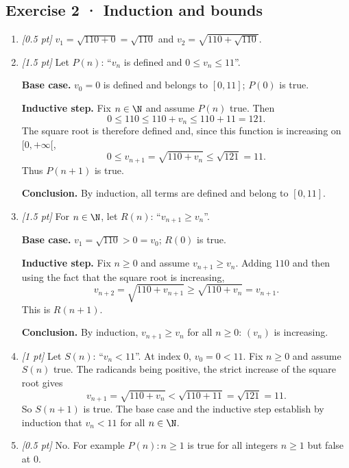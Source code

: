 \subsection*{Exercise 2 · Induction and bounds}\begin{enumerate}

\item \textit{[0.5 pt]} $v_1=\sqrt{110+0}=\sqrt{110}$ and $v_2=\sqrt{110+\sqrt{110}}$.

\item \textit{[1.5 pt]} Let $P(n)$: ``$v_n$ is defined and $0\le v_n\le 11$''.
\par\smallskip\textbf{Base case.} $v_0=0$ is defined and belongs to $[0,11]$; $P(0)$ is true.
\par\smallskip\textbf{Inductive step.} Fix $n\in\N$ and assume $P(n)$ true. Then
\[0\le 110\le 110+v_n\le 110+11=121.\]
The square root is therefore defined and, since this function is increasing on $[0,+\infty[$,
\[0\le v_{n+1}=\sqrt{110+v_n}\le\sqrt{121}=11.\]
Thus $P(n+1)$ is true.
\par\smallskip\textbf{Conclusion.} By induction, all terms are defined and belong to $[0,11]$.

\item \textit{[1.5 pt]} For $n\in\N$, let $R(n)$: ``$v_{n+1}\ge v_n$''.
\par\smallskip\textbf{Base case.} $v_1=\sqrt{110}>0=v_0$; $R(0)$ is true.
\par\smallskip\textbf{Inductive step.} Fix $n\ge0$ and assume $v_{n+1}\ge v_n$. Adding $110$ and then using the fact that the square root is increasing,
\[v_{n+2}=\sqrt{110+v_{n+1}}\ge\sqrt{110+v_n}=v_{n+1}.\]
This is $R(n+1)$.
\par\smallskip\textbf{Conclusion.} By induction, $v_{n+1}\ge v_n$ for all $n\ge0$: $(v_n)$ is increasing.

\item \textit{[1 pt]} Let $S(n)$: ``$v_n<11$''. At index $0$, $v_0=0<11$.
Fix $n\ge0$ and assume $S(n)$ true. The radicands being positive, the strict increase of the square root gives
\[v_{n+1}=\sqrt{110+v_n}<\sqrt{110+11}=\sqrt{121}=11.\]
So $S(n+1)$ is true. The base case and the inductive step establish by induction that $v_n<11$ for all $n\in\N$.

\item \textit{[0.5 pt]} No. For example $P(n):n\ge1$ is true for all integers $n\ge1$ but false at $0$.

\end{enumerate}


